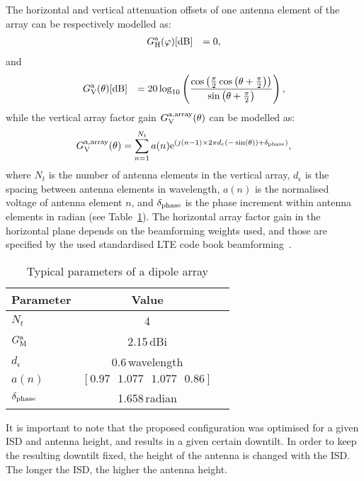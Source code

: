 \documentclass{IEEEtran}
\begin{document}
The horizontal and vertical attenuation offsets of one antenna element of the array can be respectively modelled as:
\begin{eqnarray}
	G^{\rm a}_{\rm H}(\varphi) {\rm [dB]} &&
	= 0 ,
	\label{eq:antennaPatternH-DipoleArray}
\end{eqnarray}
and
\begin{eqnarray}
	G^{\rm a}_{\rm V}(\theta) {\rm [dB]} &&=
	20 \log_{10}  \left( \frac{\cos \left( \frac{\pi}{2}\cos \left(\theta + \frac{\pi}{2} \right) \right)}{\sin \left(\theta + \frac{\pi}{2} \right)} \right) ,
	\label{eq:antennaPatternV-DipoleArra}
\end{eqnarray}
while the vertical array factor gain $G_{\rm V}^{\rm a, array}(\theta)$ can be modelled as:
 \begin{eqnarray}
	G_{\rm V}^{\rm a, array}(\theta) =
	\sum_{n=1}^{N_t} a(n) {\rm e}^{(j (n-1) \times 2 \pi d_{\epsilon} (-\sin(\theta)) + \delta_{\rm phase})},
	\label{eq:antennaPatternV-DipoleArray}
\end{eqnarray}
where $N_t$ is the number of antenna elements in the vertical array,
$d_{\epsilon}$ is the spacing between antenna elements in wavelength,
$a(n)$ is the normalised voltage of antenna element $n$,
and $\delta_{\rm phase}$ is the phase increment within antenna elements in radian
(see Table~\ref{tab:dipoleParameters}).
The horizontal array factor gain in the horizontal plane depends on the beamforming weights used,
and those are specified by the used standardised \ac{LTE} code book beamforming~\cite{LTEbook}.






\begin{table}[t]
\centering
\caption{Typical parameters of a dipole array}{
\begin{tabular}{@{}lcc@{}}
\toprule
\bf{Parameter} & \bf{Value}\\
\midrule
$N_t$         		& 4\\
$G^{\rm a}_{\rm M}$ & 2.15\,dBi\\
$d_{\epsilon}$         	& 0.6\,wavelength\\
$a(n)$        		& $[0.97 \,\,\,\, 1.077 \,\,\,\, 1.077 \,\,\,\, 0.86]$\\
$\delta_{\rm phase}$& 1.658\,radian\\
\midrule
\end{tabular}}
\label{tab:dipoleParameters}
\end{table}

It is important to note that the proposed configuration was optimised for a given \ac{ISD} and antenna height,
and results in a given certain downtilt.
In order to keep the resulting downtilt fixed,
the height of the antenna is changed with the \ac{ISD}.
The longer the \ac{ISD}, the higher the antenna height.
\end{document}
